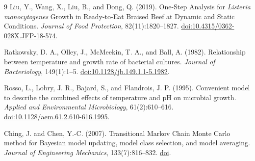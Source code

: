 \documentclass[11pt,a4paper]{article}
\begin{document}
\begin{thebibliography}{9}
Liu, Y., Wang, X., Liu, B., and Dong, Q. (2019).
One-Step Analysis for \textit{Listeria monocytogenes} Growth in
Ready-to-Eat Braised Beef at Dynamic and Static Conditions.
\textit{Journal of Food Protection}, 82(11):1820--1827.
\href{https://doi.org/10.4315/0362-028X.JFP-18-574}{doi:10.4315/0362-028X.JFP-18-574}.

Ratkowsky, D. A., Olley, J., McMeekin, T. A., and Ball, A. (1982).
Relationship between temperature and growth rate of bacterial cultures.
\textit{Journal of Bacteriology}, 149(1):1--5.
\href{https://doi.org/10.1128/jb.149.1.1-5.1982}{doi:10.1128/jb.149.1.1-5.1982}.

Rosso, L., Lobry, J. R., Bajard, S., and Flandrois, J. P. (1995).
Convenient model to describe the combined effects of temperature and
pH on microbial growth.
\textit{Applied and Environmental Microbiology}, 61(2):610--616.
\href{https://doi.org/10.1128/aem.61.2.610-616.1995}{doi:10.1128/aem.61.2.610-616.1995}.

Ching, J. and Chen, Y.-C. (2007).
Transitional Markov Chain Monte Carlo method for Bayesian model
updating, model class selection, and model averaging.
\textit{Journal of Engineering Mechanics}, 133(7):816--832.
\href{https://doi.org/10.1061/(ASCE)0733-9399(2007)133:7(816)}{doi}.
\end{thebibliography}
\end{document}
